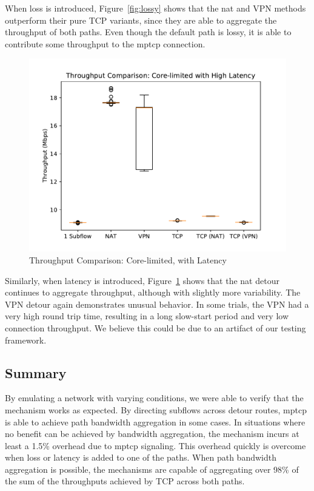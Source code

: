 \documentclass{cwru}
\begin{document}
When loss is introduced, Figure~\ref{fig:lossy} shows that the \ac{nat} and VPN
methods outperform their pure TCP variants, since they are able to aggregate the
throughput of both paths. Even though the default path is lossy, it is able to
contribute some throughput to the \ac{mptcp} connection.

\begin{figure}[htbp]
  \centering
  \includegraphics[height=0.42\textheight]{figures/delayed.pdf}
  \caption{Throughput Comparison: Core-limited, with Latency}
  \label{fig:delayed}
\end{figure}

Similarly, when latency is introduced, Figure~\ref{fig:delayed} shows that the
\ac{nat} detour continues to aggregate throughput, although with slightly more
variability. The VPN detour again demonstrates unusual behavior. In some trials,
the VPN had a very high round trip time, resulting in a long slow-start period
and very low connection throughput. We believe this could be due to an artifact
of our testing framework.

\subsection{Summary}

By emulating a network with varying conditions, we were able to verify that the
mechanism works as expected. By directing subflows across detour routes,
\ac{mptcp} is able to achieve path bandwidth aggregation in some cases. In
situations where no benefit can be achieved by bandwidth aggregation, the
mechanism incurs at least a 1.5\% overhead due to \ac{mptcp} signaling. This
overhead quickly is overcome when loss or latency is added to one of the paths.
When path bandwidth aggregation is possible, the mechanisms are capable of
aggregating over 98\% of the sum of the throughputs achieved by TCP across both
paths.
\end{document}
